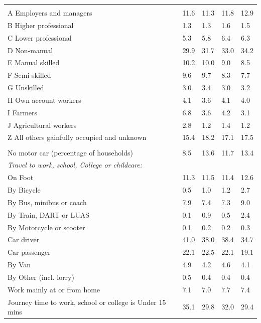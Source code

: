 \documentclass{article}
\begin{document}
\begin{table}[h]
\begin{tabular}{KTTTT}
\hline
    \\ 
    \hline
A Employers and managers & 11.6& 11.3& 11.8& 12.9\\
B Higher professional & 1.3& 1.3& 1.6& 1.5\\
C Lower professional & 5.3& 5.8& 6.4& 6.3\\
D Non-manual & 29.9& 31.7& 33.0& 34.2\\
E Manual skilled & 10.2& 10.0&  9.0&  8.5\\
F Semi-skilled & 9.6& 9.7& 8.3& 7.7\\
G Unskilled & 3.0& 3.4& 3.0& 3.2\\
H Own account workers & 4.1& 3.6& 4.1& 4.0\\
I Farmers & 6.8& 3.6& 4.2& 3.1\\
J Agricultural workers & 2.8& 1.2& 1.4& 1.2\\
Z All others gainfully occupied and unknown & 15.4& 18.2& 17.1& 17.5\\
\hline
{}\hline
    \\ 
    \hline
No motor car (percentage of households) &  8.5& 13.6& 11.7& 
13.4\\
    \hline 
\emph{Travel to work, school, College or childcare:} & & & \\
\quad On Foot & 11.3& 11.5& 11.4& 12.6\\ 
\quad By Bicycle & 0.5& 1.0& 1.2& 2.7\\ 
\quad By Bus, minibus or coach & 7.9& 7.4& 7.3& 9.0\\
\quad By Train, DART or LUAS & 0.1& 0.9& 0.5& 2.4\\
\quad By Motorcycle or scooter & 0.1& 0.2& 0.2& 0.3\\
\quad Car driver & 41.0 & 38.0& 38.4& 34.7\\
\quad Car passenger & 22.1& 22.5& 22.1& 19.1\\
\quad By Van & 4.9& 4.2& 4.6& 4.1\\
\quad By Other (incl. lorry) & 0.5& 0.4& 0.4& 0.4\\
    \hline
Work mainly at or from home & 7.1& 7.0& 7.7& 7.4\\
Journey time to work, school or college is Under 15 mins & 35.1& 29.8& 32.0& 29.4\\

\end{tabular}
\end{table}
\end{document}

